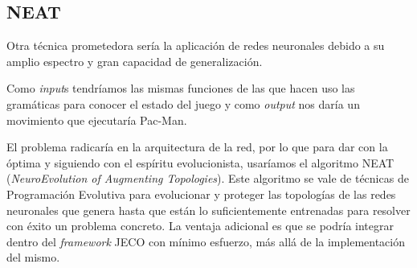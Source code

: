 \subsection{NEAT}
Otra técnica prometedora sería la aplicación de redes neuronales debido a su amplio espectro y gran capacidad de generalización.

Como \textit{input}s tendríamos las mismas funciones de las que hacen uso las gramáticas para conocer el estado del juego y como \textit{output} nos daría un movimiento que ejecutaría Pac-Man.

El problema radicaría en la arquitectura de la red, por lo que para dar con la óptima y siguiendo con el espíritu evolucionista, usaríamos el algoritmo NEAT \cite{stanley2002evolving} (\textit{NeuroEvolution of Augmenting Topologies}). Este algoritmo se vale de técnicas de Programación Evolutiva para evolucionar y proteger las topologías de las redes neuronales que genera hasta que están lo suficientemente entrenadas para resolver con éxito un problema concreto. La ventaja adicional es que se podría integrar dentro del \textit{framework} JECO con mínimo esfuerzo, más allá de la implementación del mismo.